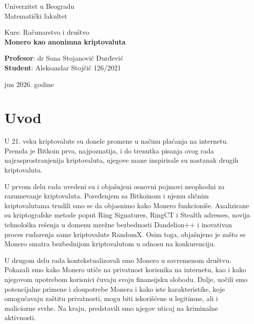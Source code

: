 \documentclass[12pt,a4paper]{article}
\begin{document}
\begin{titlepage}
\centering

{\Large Univerzitet u Beogradu\\}
\vspace{0.5cm}
{\Large Matematički fakultet}

\vspace{3cm}

{\large Kurs: Računarstvo i društvo \\}
\vspace{0.5cm}
{\LARGE \textbf{Monero kao anonimna kriptovaluta} }

\vfill

\begin{flushleft}
\textbf{Profesor}: dr Sana Stojanović Đurđević \\
\textbf{Student}: Aleksandar Stojčič 126/2021
\end{flushleft}

\vspace{0.5cm}

\centering
{\large jun 2026. godine}

\end{titlepage}

\newpage

\tableofcontents

\newpage

\section{Uvod}

U 21. veku kriptovalute su donele promene u načinu plaćanja na internetu. Premda je Bitkoin prva, najpoznatija, i do trenutka pisanja ovog rada najrasprostranjenija kriptovaluta, njegove mane inspirisale su nastanak drugih kriptovaluta.

U prvom delu rada uvedeni su i objašnjeni osnovni pojmovi neophodni za razumevanje kriptovaluta. Poređenjem sa Bitkoinom i njemu sličnim kriptovalutama trudili smo se da objasnimo kako Monero funkcioniše. Analizirane su kriptografske metode poput Ring Signatures, RingCT i Stealth adresses, novija tehnološka rešenja u domenu mrežne bezbednosti Dandelion++ i inovativan proces rudarenja same kriptovalute RandomX. Osim toga, objašnjeno je zašto se Monero smatra bezbednijom kriptovalutom u odnosu na konkurenciju.

U drugom delu rada kontekstualizovali smo Monero u savremenom društvu. Pokazali smo kako Monero utiče na privatnost korisnika na internetu, kao i kako njegovom upotrebom korisnici čuvaju svoju finansijsku slobodu. Dalje, uočili smo potencijalne primene i zloupotrebe Monera i kako iste karakteristike, koje omogućavaju zaštitu privatnosti, mogu biti iskorišćene u legitimne, ali i maliciozne svrhe. Na kraju, predstavili smo njegov uticaj na kriminalne aktivnosti.\\
\end{document}
